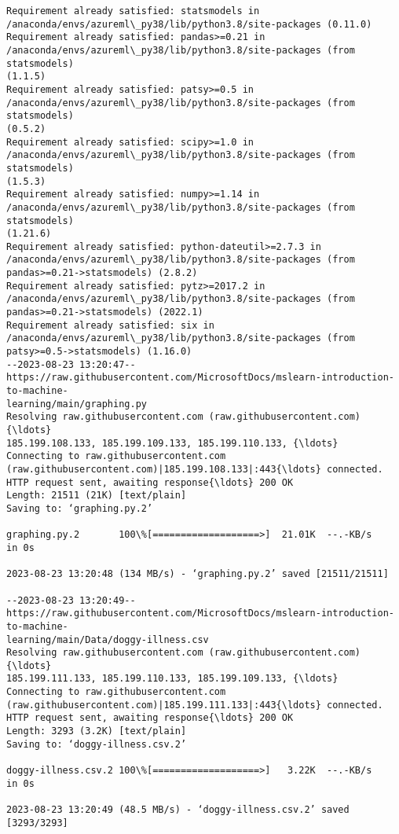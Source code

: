 \documentclass[11pt]{article}
\begin{document}
    \begin{Verbatim}[commandchars=\\\{\}]
Requirement already satisfied: statsmodels in
/anaconda/envs/azureml\_py38/lib/python3.8/site-packages (0.11.0)
Requirement already satisfied: pandas>=0.21 in
/anaconda/envs/azureml\_py38/lib/python3.8/site-packages (from statsmodels)
(1.1.5)
Requirement already satisfied: patsy>=0.5 in
/anaconda/envs/azureml\_py38/lib/python3.8/site-packages (from statsmodels)
(0.5.2)
Requirement already satisfied: scipy>=1.0 in
/anaconda/envs/azureml\_py38/lib/python3.8/site-packages (from statsmodels)
(1.5.3)
Requirement already satisfied: numpy>=1.14 in
/anaconda/envs/azureml\_py38/lib/python3.8/site-packages (from statsmodels)
(1.21.6)
Requirement already satisfied: python-dateutil>=2.7.3 in
/anaconda/envs/azureml\_py38/lib/python3.8/site-packages (from
pandas>=0.21->statsmodels) (2.8.2)
Requirement already satisfied: pytz>=2017.2 in
/anaconda/envs/azureml\_py38/lib/python3.8/site-packages (from
pandas>=0.21->statsmodels) (2022.1)
Requirement already satisfied: six in
/anaconda/envs/azureml\_py38/lib/python3.8/site-packages (from
patsy>=0.5->statsmodels) (1.16.0)
--2023-08-23 13:20:47--
https://raw.githubusercontent.com/MicrosoftDocs/mslearn-introduction-to-machine-
learning/main/graphing.py
Resolving raw.githubusercontent.com (raw.githubusercontent.com){\ldots}
185.199.108.133, 185.199.109.133, 185.199.110.133, {\ldots}
Connecting to raw.githubusercontent.com
(raw.githubusercontent.com)|185.199.108.133|:443{\ldots} connected.
HTTP request sent, awaiting response{\ldots} 200 OK
Length: 21511 (21K) [text/plain]
Saving to: ‘graphing.py.2’

graphing.py.2       100\%[===================>]  21.01K  --.-KB/s    in 0s

2023-08-23 13:20:48 (134 MB/s) - ‘graphing.py.2’ saved [21511/21511]

--2023-08-23 13:20:49--
https://raw.githubusercontent.com/MicrosoftDocs/mslearn-introduction-to-machine-
learning/main/Data/doggy-illness.csv
Resolving raw.githubusercontent.com (raw.githubusercontent.com){\ldots}
185.199.111.133, 185.199.110.133, 185.199.109.133, {\ldots}
Connecting to raw.githubusercontent.com
(raw.githubusercontent.com)|185.199.111.133|:443{\ldots} connected.
HTTP request sent, awaiting response{\ldots} 200 OK
Length: 3293 (3.2K) [text/plain]
Saving to: ‘doggy-illness.csv.2’

doggy-illness.csv.2 100\%[===================>]   3.22K  --.-KB/s    in 0s

2023-08-23 13:20:49 (48.5 MB/s) - ‘doggy-illness.csv.2’ saved [3293/3293]

    \end{Verbatim}
\end{document}
